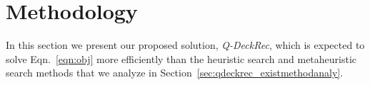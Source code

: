 



\section{Methodology}\label{sec:method}
In this section we present our proposed solution, \textit{Q-DeckRec}, which is expected to solve Eqn.~\ref{eqn:obj} more efficiently than the heuristic search and metaheuristic search methods that we analyze in Section~\ref{sec:qdeckrec_existmethodanaly}. 







